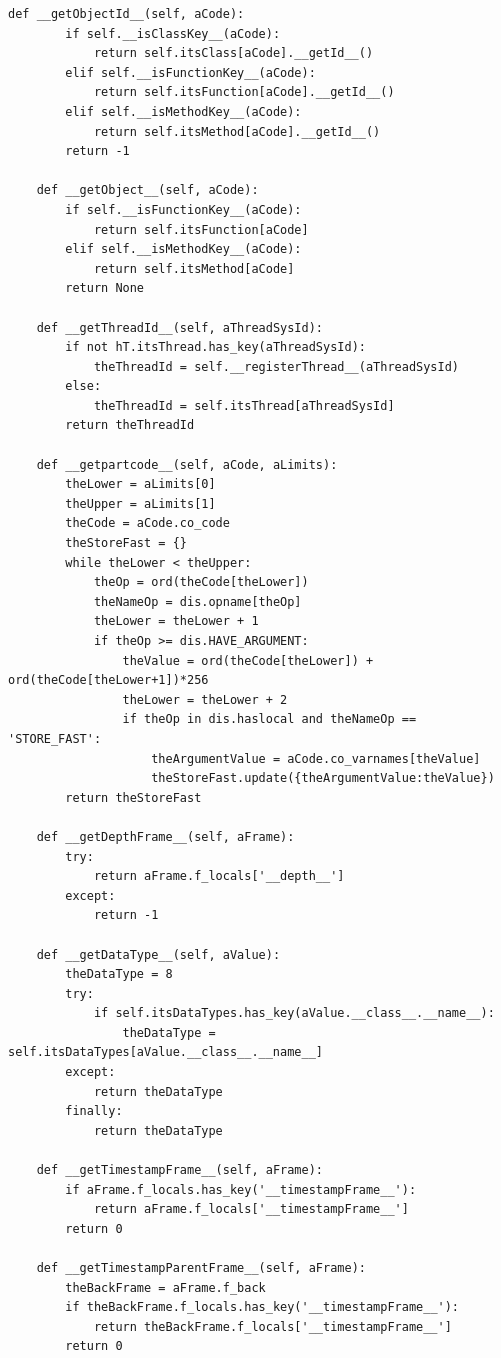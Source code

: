 \documentclass[12pt,legalpaper]{report}
\begin{document}
\begin{singlespace}
\begin{lstlisting}[style=Python]
    def __getObjectId__(self, aCode):
        if self.__isClassKey__(aCode):
            return self.itsClass[aCode].__getId__()
        elif self.__isFunctionKey__(aCode):
            return self.itsFunction[aCode].__getId__()
        elif self.__isMethodKey__(aCode):
            return self.itsMethod[aCode].__getId__()
        return -1

    def __getObject__(self, aCode):
        if self.__isFunctionKey__(aCode):
            return self.itsFunction[aCode]
        elif self.__isMethodKey__(aCode):
            return self.itsMethod[aCode]
        return None

    def __getThreadId__(self, aThreadSysId):
        if not hT.itsThread.has_key(aThreadSysId):
            theThreadId = self.__registerThread__(aThreadSysId)
        else:
            theThreadId = self.itsThread[aThreadSysId]
        return theThreadId

    def __getpartcode__(self, aCode, aLimits):
        theLower = aLimits[0]
        theUpper = aLimits[1]
        theCode = aCode.co_code
        theStoreFast = {}    
        while theLower < theUpper:
            theOp = ord(theCode[theLower])
            theNameOp = dis.opname[theOp]
            theLower = theLower + 1
            if theOp >= dis.HAVE_ARGUMENT:
                theValue = ord(theCode[theLower]) + ord(theCode[theLower+1])*256
                theLower = theLower + 2
                if theOp in dis.haslocal and theNameOp == 'STORE_FAST':
                    theArgumentValue = aCode.co_varnames[theValue]
                    theStoreFast.update({theArgumentValue:theValue})
        return theStoreFast

    def __getDepthFrame__(self, aFrame):
        try:
            return aFrame.f_locals['__depth__']
        except:
            return -1
    
    def __getDataType__(self, aValue):
        theDataType = 8
        try:
            if self.itsDataTypes.has_key(aValue.__class__.__name__):
                theDataType = self.itsDataTypes[aValue.__class__.__name__]
        except:
            return theDataType
        finally:
            return theDataType

    def __getTimestampFrame__(self, aFrame):
        if aFrame.f_locals.has_key('__timestampFrame__'):
            return aFrame.f_locals['__timestampFrame__']
        return 0

    def __getTimestampParentFrame__(self, aFrame):
        theBackFrame = aFrame.f_back 
        if theBackFrame.f_locals.has_key('__timestampFrame__'):
            return theBackFrame.f_locals['__timestampFrame__']
        return 0


\end{lstlisting}
\end{singlespace}
\end{document}
